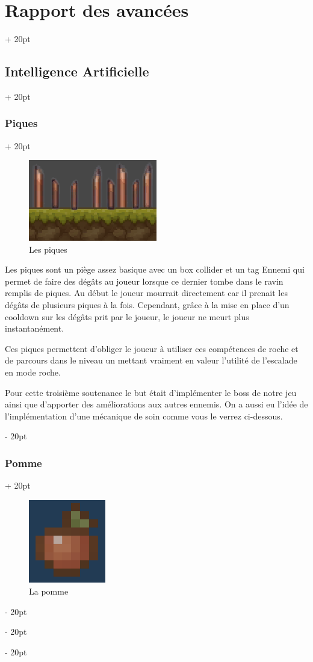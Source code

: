 \documentclass[a4paper, 12pt, twoside]{article}
\newcommand{\ind}[1][20pt]{\advance\leftskip + #1}
\newcommand{\deind}[1][20pt]{\advance\leftskip - #1}
\newenvironment{indt}[2][20pt]{#2 \par \ind[#1]}{\par \deind} %
\begin{document}
\begin{indt}{\section{Rapport des avancées}}
\begin{indt}{\subsection{Intelligence Artificielle}}
            \begin{indt}{\subsubsection{Piques}}
                \begin{figure}[h]
                    \centering
                    \includegraphics[width=0.5\textwidth]{pique.png}
                    \caption{Les piques}
                    \label{fig:mesh1}
                \end{figure}

                Les piques sont un piège assez basique avec un box collider et un tag Ennemi qui permet de faire des dégâts au joueur lorsque ce dernier tombe dans le ravin remplis de piques. Au début le joueur mourrait directement car il prenait les dégâts de plusieurs piques à la fois. Cependant, grâce à la mise en place d’un cooldown sur les dégâts prit par le joueur, le joueur ne meurt plus instantanément.

                Ces piques permettent d’obliger le joueur à utiliser ces compétences de roche et de parcours dans le niveau un mettant vraiment en valeur l’utilité de l’escalade en mode roche.

                Pour cette troisième soutenance le but était d’implémenter le boss de notre jeu ainsi que d’apporter des améliorations aux autres ennemis. On a aussi eu l’idée de l'implémentation d’une mécanique de soin comme vous le verrez ci-dessous.
            \end{indt}

            \newpage

            \begin{indt}{\subsubsection{Pomme}}
                \begin{figure}[h]
                    \centering
                    \includegraphics[width=0.3\textwidth]{Pomme.png}
                    \caption{La pomme}
                    \label{fig:mesh1}
                \end{figure}


\end{indt}
\end{indt}
\end{indt}
\end{document}
